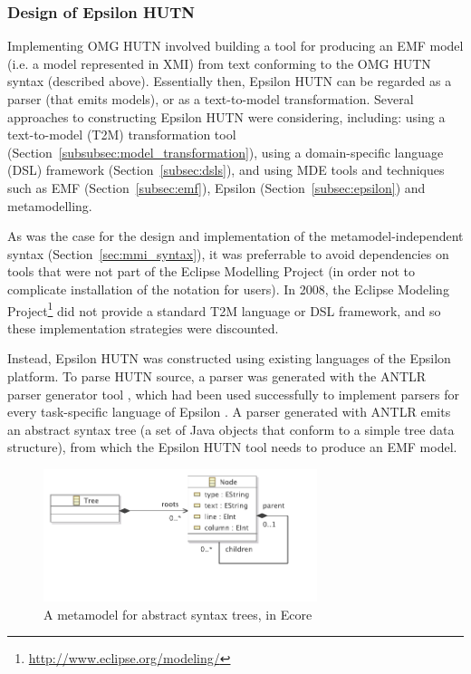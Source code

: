 \subsubsection{Design of Epsilon HUTN}
Implementing OMG HUTN involved building a tool for producing an EMF model (i.e. a model represented in XMI) from text conforming to the OMG HUTN syntax (described above). Essentially then, Epsilon HUTN can be regarded as a parser (that emits models), or as a text-to-model transformation. Several approaches to constructing Epsilon HUTN were considering, including: using a text-to-model (T2M) transformation tool (Section~\ref{subsubsec:model_transformation}), using a domain-specific language (DSL) framework (Section~\ref{subsec:dsls}), and using MDE tools and techniques such as EMF (Section~\ref{subsec:emf}), Epsilon (Section~\ref{subsec:epsilon}) and metamodelling.

As was the case for the design and implementation of the metamodel-independent syntax (Section~\ref{sec:mmi_syntax}), it was preferrable to avoid dependencies on tools that were not part of the Eclipse Modelling Project (in order not to complicate installation of the notation for users). In 2008, the Eclipse Modeling Project\footnote{\url{http://www.eclipse.org/modeling/}} did not provide a standard T2M language or DSL framework, and so these implementation strategies were discounted.

Instead, Epsilon HUTN was constructed using existing languages of the Epsilon platform. To parse HUTN source, a parser was generated with the ANTLR parser generator tool \cite{parr07antlr}, which had been used successfully to implement parsers for every task-specific language of Epsilon \cite{kolovos09thesis}. A parser generated with ANTLR emits an abstract syntax tree (a set of Java objects that conform to a simple tree data structure), from which the Epsilon HUTN tool needs to produce an EMF model.

\begin{figure}[htbp]
  \centering
  \includegraphics[width=8cm]{5.Implementation/images/ast_metamodel.pdf}
  \caption{A metamodel for abstract syntax trees, in Ecore}
  \label{fig:ast_metamodel}
\end{figure}

